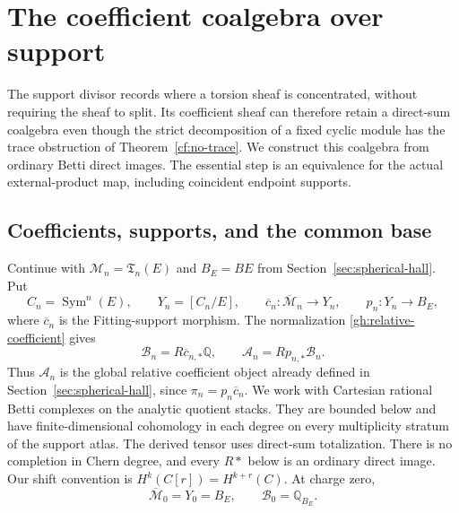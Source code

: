 \section{The coefficient coalgebra over support}
\label{sec:support-coalgebra}

The support divisor records where a torsion sheaf is concentrated,
without requiring the sheaf to split. Its coefficient sheaf can therefore
retain a direct-sum coalgebra even though the strict decomposition of a
fixed cyclic module has the trace obstruction of
Theorem~\ref{cf:no-trace}. We construct this coalgebra from ordinary
Betti direct images. The essential step is an equivalence for the
actual external-product map, including coincident endpoint supports.

\subsection{Coefficients, supports, and the common base}

Continue with $\mathcal M_n=\mathfrak T_n(E)$ and
$B_E=BE$ from Section~\ref{sec:spherical-hall}. Put
\[
 C_n=\operatorname{Sym}^n(E),\qquad Y_n=[C_n/E],\qquad
 \overline c_n:\overline{\mathcal M}_n\longrightarrow Y_n,
 \qquad p_n:Y_n\longrightarrow B_E,
\]
where $\overline c_n$ is the Fitting-support morphism.
The normalization \eqref{gh:relative-coefficient} gives
\begin{equation}\label{sc:coefficients}
 \mathcal B_n=R\overline c_{n,*}\mathbb Q,
 \qquad \mathcal A_n=Rp_{n,*}\mathcal B_n.
\end{equation}
Thus $\mathcal A_n$ is the global relative coefficient object already
defined in Section~\ref{sec:spherical-hall}, since
$\pi_n=p_n\overline c_n$.
We work with Cartesian rational Betti complexes on the analytic
quotient stacks. They are bounded below and have finite-dimensional
cohomology in each degree on every multiplicity stratum of the support
atlas. The derived tensor uses direct-sum totalization. There is no
completion in Chern degree, and every $R*$ below is an ordinary direct
image. Our shift convention is $H^k(C[r])=H^{k+r}(C)$.
At charge zero,
\[
 \overline{\mathcal M}_0=Y_0=B_E,\qquad
 \mathcal B_0=\mathbb Q_{B_E}.
\]

